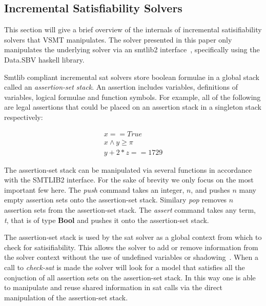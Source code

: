 \subsection{Incremental Satisfiability Solvers}
\label{bk-sat}
This section will give a brief overview of the internals of incremental
satisifiability solvers that VSMT manipulates. The solver presented in this
paper only manipulates the underlying solver via an smtlib2
interface~\cite{BarFT-SMTLIB}, specifically using the 
Data.SBV haskell library.

Smtlib compliant incremental sat solvers store boolean formulae in a global
stack called an \textit{assertion-set stack}. An assertion includes variables,
definitions of variables, logical formulae and function symbols. For example,
all of the following are legal assertions that could be placed on an assertion
stack in a singleton stack respectively:

\begin{align*}
  x == True \\
  x \wedge y \geq \pi \\
  y + 2 * z == 1729
\end{align*}

The assertion-set stack can be manipulated via several functions in accordance
with the SMTLIB2 interface. For the sake of brevity we only focus on the most
important few here. The \textit{push} command takes an integer, $n$, and pushes
$n$ many empty assertion sets onto the assertion-set stack. Similary
\textit{pop} removes $n$ assertion sets from the assertion-set stack. The
\textit{assert} command takes any term, \textit{t}, that is of type
\textbf{Bool} and pushes it onto the assertion-set stack.

The assertion-set stack is used by the sat solver as a global context from which
to check for satisifiability. This allows the solver to add or remove
information from the solver context without the use of undefined variables or
shadowing~\cite{BarFT-SMTLIB}. When a call to \textit{check-sat} is made the
solver will look for a model that satisfies all the conjuction of all assertion
sets on the assertion-set stack. In this way one is able to manipulate and reuse
shared information in sat calls via the direct manipulation of the assertion-set
stack.